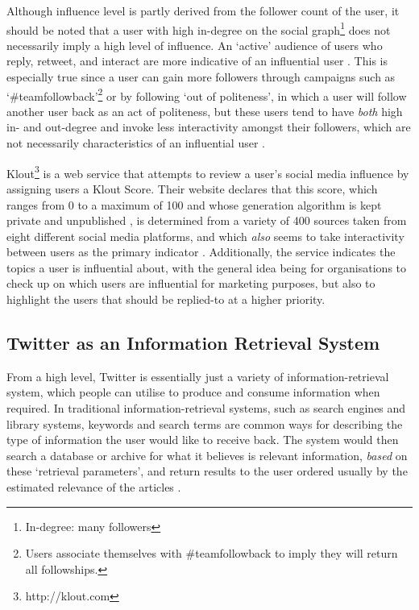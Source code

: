 Although influence level is partly derived from the follower count of the user, it should be noted that a user with high in-degree on the social graph\footnote{In-degree: many followers} does not necessarily imply a high level of influence. An `active' audience of users who reply, retweet, and interact are more indicative of an influential user \cite{bigonha10}. This is especially true since a user can gain more followers through campaigns such as `\#teamfollowback'\footnote{Users associate themselves with \#teamfollowback to imply they will return all followships.} or by following `out of politeness', in which a user will follow another user back as an act of politeness, but these users tend to have \textit{both} high in- and out-degree and invoke less interactivity amongst their followers, which are not necessarily characteristics of an influential user \cite{cha10}.

Klout\footnote{http://klout.com} is a web service that attempts to review a user's social media influence by assigning users a Klout Score. Their website declares that this score, which ranges from 0 to a maximum of 100 and whose generation algorithm is kept private and unpublished \cite{edwards13}, is determined from a variety of 400 sources taken from eight different social media platforms, and which \textit{also} seems to take interactivity between users as the primary indicator \cite{anger11}. Additionally, the service indicates the topics a user is influential about, with the general idea being for organisations to check up on which users are influential for marketing purposes, but also to highlight the users that should be replied-to at a higher priority.


\subsection{Twitter as an Information Retrieval System}
From a high level, Twitter is essentially just a variety of information-retrieval system, which people can utilise to produce and consume information when required. In traditional information-retrieval systems, such as search engines and library systems, keywords and search terms are common ways for describing the type of information the user would like to receive back. The system would then search a database or archive for what it believes is relevant information, \textit{based} on these `retrieval parameters', and return results to the user ordered usually by the estimated relevance of the articles \cite{arvola10}.

